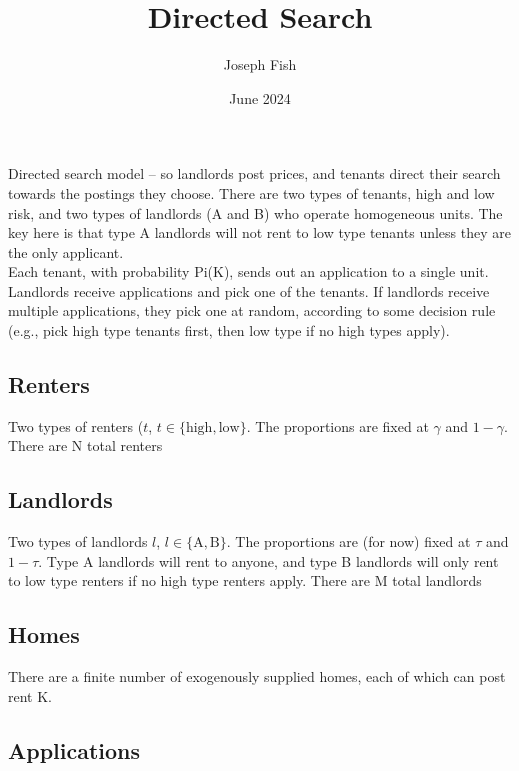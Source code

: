 \documentclass{article}
\title{Directed Search}
\author{Joseph Fish}
\date{June 2024}
\begin{document}
Directed search model -- so landlords post prices, and tenants direct their search towards the postings they choose. There are two types of tenants, high and low risk, and two types of landlords (A and B) who operate homogeneous units. The key here is that type A landlords will not rent to low type tenants unless they are the only applicant. \\

Each tenant, with probability Pi(K), sends out an application to a single unit. Landlords receive applications and pick one of the tenants. If landlords receive multiple applications, they pick one at random, according to some decision rule (e.g., pick high type tenants first, then low type if no high types apply).
\subsection{Renters}
Two types of renters ($t$, $t \in \{\text{high}, \text{low}\}$. The proportions are fixed at $\gamma$ and $1-\gamma$. There are N total renters

\subsection{Landlords}
Two types of landlords $l$, $l \in \{\text{A}, \text{B}\}$. The proportions are (for now) fixed at $\tau$ and $1-\tau$. Type A landlords will rent to anyone, and type B landlords will only rent to low type renters if no high type renters apply. There are M total landlords

\subsection{Homes}
There are a finite number of exogenously supplied homes, each of which can post rent K. 
\subsection{Applications}
\end{document}
